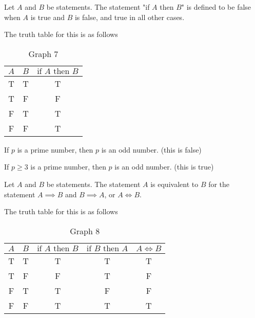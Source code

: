 \documentclass[10pt, a4paper]{article}
\begin{document}
\begin{definition}
    Let $A$ and $B$ be statements. The statement "if $A$ then $B$" is defined to be false when $A$ is true and $B$ is false, and true in all other cases.

    The truth table for this is as follows
    \begin{table}[h!]
        \centering
        \begin{tabular}{|c|c|c|}
            \hline
            $A$ & $B$ & $\text{if } A \text{ then } B$ \\
            \hline
            T & T & T \\
            T & F & F \\
            F & T & T \\
            F & F & T \\
            \hline
        \end{tabular}
        \caption{Graph 7}
        \label{tab:Gr7}
    \end{table}
\end{definition}
\begin{example}
    If $p$ is a prime number, then $p$ is an odd number. (this is false)

    If $p \geq 3$ is a prime number, then $p$ is an odd number. (this is true)
\end{example}

\begin{definition}
    Let $A$ and $B$ be statements. The statement $A$ is equivalent to $B$ for the statement $A \implies B$ and $B \implies A$, or $A \iff B$.
    
    The truth table for this is as follows
    \begin{table}[h!]
        \centering
        \begin{tabular}{|c|c|c|c|c|}
            \hline
            $A$ & $B$ & $\text{if } A \text{ then } B$ & $\text{if } B \text{ then } A$ & $A \iff B$ \\
            \hline
            T & T & T & T & T \\
            T & F & F & T & F \\
            F & T & T & F & F \\
            F & F & T & T & T \\
            \hline
        \end{tabular}
        \caption{Graph 8}
        \label{tab:Gr8}
    \end{table}
\end{definition}
\end{document}
